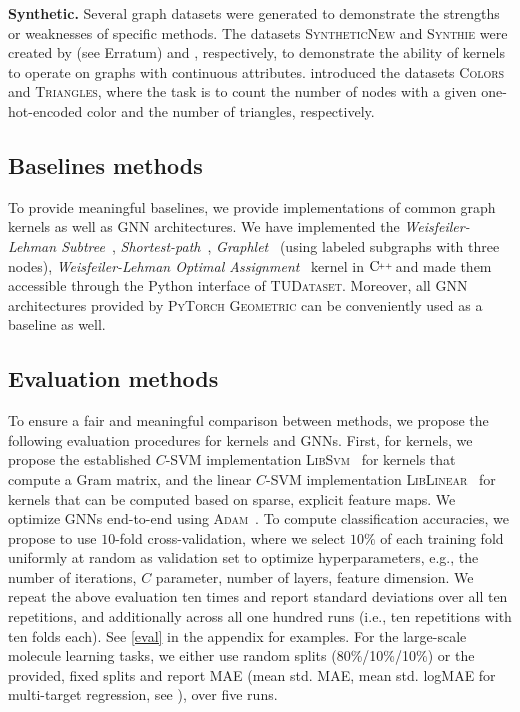 \documentclass{article}
\newcommand{\xhdr}[1]{{\noindent\bfseries #1}}
\theoremstyle{definition}
\newcommand{\new}[1]{\emph{#1}}
\newcommand{\CPP}[1][]{$\text{C\hspace{-.25ex}}^{_{_{_{++}}}}
	\ifthenelse{\equal{#1}{}}{}{\text{\hspace{-.625ex}#1}}$}
\begin{document}
\xhdr{Synthetic.}
Several graph datasets were generated to demonstrate the strengths or weaknesses of specific methods. The datasets \textsc{SyntheticNew} and \textsc{Synthie} were created by \citet{Fer+2013} (see Erratum) and \citet{Mor+2016}, respectively, to demonstrate the ability of kernels to operate on graphs with continuous attributes. \citet{Knyazev2019} introduced the datasets \textsc{Colors} and \textsc{Triangles}, where the task is to count the number of nodes with a given one-hot-encoded color and the number of triangles, respectively. 

\subsection{Baselines methods} To provide meaningful baselines, we provide implementations of common graph kernels as well as GNN architectures. We have implemented the \new{Weisfeiler-Lehman Subtree}~\cite{She+2011}, \new{Shortest-path}~\cite{Bor+2005}, \new{Graphlet}~\cite{She+2009} (using labeled subgraphs with three nodes), \new{Weisfeiler-Lehman Optimal Assignment}~\cite{Kri+2016} kernel in \CPP and made them accessible through the Python interface of \textsc{TUDataset}.  Moreover, all GNN architectures provided by \textsc{PyTorch Geometric} can be conveniently used as a baseline as well. 

\subsection{Evaluation methods}\label{evalm} To ensure a fair and meaningful comparison between methods, we propose the following evaluation procedures for kernels and GNNs. First, for kernels, we propose the established $C$-SVM implementation \textsc{LibSvm}~\cite{Cha+11} for kernels that compute a Gram matrix, and the linear $C$-SVM implementation \textsc{LibLinear}~\cite{Fan+2008} for kernels  that can be computed based on sparse, explicit feature maps. We optimize GNNs end-to-end using \textsc{Adam}~\cite{Kin+2015}. To compute classification accuracies, we propose to use $10$-fold cross-validation, where we select $10\%$ of each training fold uniformly at random as validation set to optimize hyperparameters, e.g., the number of iterations, $C$ parameter, number of layers, feature dimension. We repeat the above evaluation ten times and report standard deviations over all ten repetitions, and additionally across all one hundred runs (i.e., ten repetitions with ten folds each). See \cref{eval} in the appendix for examples. For the large-scale molecule learning tasks, we either use random splits (80\%/10\%/10\%) or the provided, fixed splits and report MAE (mean std. MAE, mean std. logMAE for multi-target regression, see \cite{Kli+2020}), over five runs. 
\end{document}
